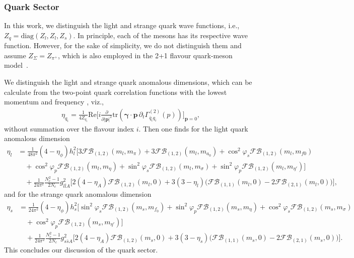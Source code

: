 \documentclass[reprint,twocolumn,superscriptaddress,preprintnumbers,amsmath,amssymb,aps,prd,floatfix]{revtex4-2}
\begin{document}
\subsubsection{Quark Sector}
\label{app:QuarkSector}

In this work, we distinguish the light and strange quark wave functions, i.e., $Z_q = \mathrm{diag}(Z_l, Z_l, Z_s)$. In principle, each of the mesons has its respective wave function. However, for the sake of simplicity, we do not distinguish them and assume $Z_\Sigma=Z_{\pi^+}$, which is also employed in the 2+1 flavour quark-meson model~\cite{Rennecke:2016tkm}. 

We distinguish the light and strange quark anomalous dimensions, which can be calculate from the two-point quark correlation functions with the lowest momentum and frequency \cite{Pawlowski:2014zaa, Fu:2015naa, Rennecke:2016tkm, Fu:2019hdw}, viz.,
%
\begin{align}
\eta_{q_i}=\frac{1}{4 Z_{q_i}} \text{Re} \Bigg [ i \frac{\partial}{\partial |\bm{p}|^2} \text{tr}\left( \bm \gamma \cdot \bm p\, \partial_t \Gamma_{{\bar q}_i  q_i}^{(2)} (p) \right)\Bigg ]_{\bm p=0},
\end{align}
%
without summation over the flavour index $i$. Then one finds for the light quark anomalous dimension
%
\begin{align}
\eta_{l}&=\frac{1}{48 \pi^2} (4-\eta_{\phi})h_{l}^2 \Big [ 3 \mathcal {FB}_{(1,2)}(m_l,m_\pi)+3 \mathcal {FB}_{(1,2)}(m_l,m_{a_0})+\cos^2\varphi_s \mathcal {FB}_{(1,2)}(m_l,m_{f0})\nonumber\\[1ex]
&\quad+\cos^2\varphi_p \mathcal {FB}_{(1,2)}(m_l,m_{\eta})+\sin^2\varphi_s \mathcal {FB}_{(1,2)}(m_l,m_{\sigma})+\sin^2\varphi_p \mathcal {FB}_{(1,2)}(m_l,m_{\eta'}) \Big]\nonumber\\[1ex]
&\quad+\frac{1}{24 \pi^2} \frac{N_c^2-1}{2 N_c} g_{l\bar l A}^2 \Big [ 2(4-\eta_{A})\mathcal {FB}_{(1,2)}(m_l,0)+3(3-\eta_{l})\big(\mathcal{FB}_{(1,1)}(m_l,0)-2 \mathcal{FB}_{(2,1)}(m_l,0)\big )\Big ],
\end{align}
%
and for the strange quark anomalous dimension
\begin{align}
\eta_{s}&=\frac{1}{24 \pi^2} (4-\eta_{\phi})h_{s}^2 \Big [\sin^2\varphi_s \mathcal {FB}_{(1,2)}(m_s,m_{f_0}) +\sin^2\varphi_p \mathcal {FB}_{(1,2)}(m_s,m_{\eta})+\cos^2\varphi_s \mathcal {FB}_{(1,2)}(m_s,m_{\sigma}) \nonumber\\[1ex]
&\quad+\cos^2\varphi_p \mathcal {FB}_{(1,2)}(m_s,m_{\eta'}) \Big ]\nonumber\\[1ex]
&\quad+\frac{1}{24 \pi^2} \frac{N_c^2-1}{2 N_c} g_{s\bar s A}^2 \Big [ 2(4-\eta_{A})\mathcal {FB}_{(1,2)}(m_s,0)+3(3-\eta_{s})\big(\mathcal{FB}_{(1,1)}(m_s,0)-2 \mathcal{FB}_{(2,1)}(m_s,0)\big) \Big ].
\end{align}
%
This concludes our discussion of the quark sector. 
\end{document}
